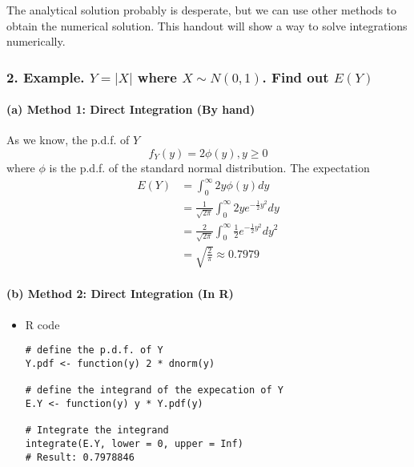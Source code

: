 \documentclass[12pt]{article}
\begin{document}
\par

The analytical solution probably is desperate, but we can use other
methods to obtain the numerical solution. This handout will show a way
to solve integrations numerically.

\hypertarget{example.-y-x-where-x-sim-n0-1.-find-out-ey}{%
\subsubsection{\texorpdfstring{2. Example. \(Y = |X|\) where
\(X \sim N(0, 1)\). Find out
\(E(Y)\)}{2. Example. Y = \textbar{}X\textbar{} where X \textbackslash{}sim N(0, 1). Find out E(Y)}}\label{example.-y-x-where-x-sim-n0-1.-find-out-ey}}

\hypertarget{a-method-1-direct-integration-by-hand}{%
\paragraph{(a) Method 1: Direct Integration (By
hand)}\label{a-method-1-direct-integration-by-hand}}

As we know, the p.d.f. of \(Y\) \begin{equation*}
                    f_Y(y) = 2\phi(y), y \ge 0
                \end{equation*} where \(\phi\) is the p.d.f. of the
standard normal distribution. The expectation \begin{equation*}
                    \begin{split}
                        E(Y) &= \int_{0}^{\infty} 2y\phi(y) dy \\
                        & = \frac{1}{\sqrt{2\pi}}\int_{0}^{\infty} 2y e^{-\frac{1}{2}y^2}dy \\
                        & = \frac{2}{\sqrt{2\pi}}\int_{0}^{\infty} \frac{1}{2} e^{-\frac{1}{2}y^2}dy^2 \\
                        & = \sqrt{\frac{2}{\pi}} \approx 0.7979
                    \end{split}
                \end{equation*}

\hypertarget{b-method-2-direct-integration-in-r}{%
\paragraph{(b) Method 2: Direct Integration (In
R)}\label{b-method-2-direct-integration-in-r}}

\begin{itemize}
\item
  R code

\begin{verbatim}
# define the p.d.f. of Y
Y.pdf <- function(y) 2 * dnorm(y)

# define the integrand of the expecation of Y
E.Y <- function(y) y * Y.pdf(y)

# Integrate the integrand
integrate(E.Y, lower = 0, upper = Inf)
# Result: 0.7978846
\end{verbatim}
\end{itemize}
\end{document}
